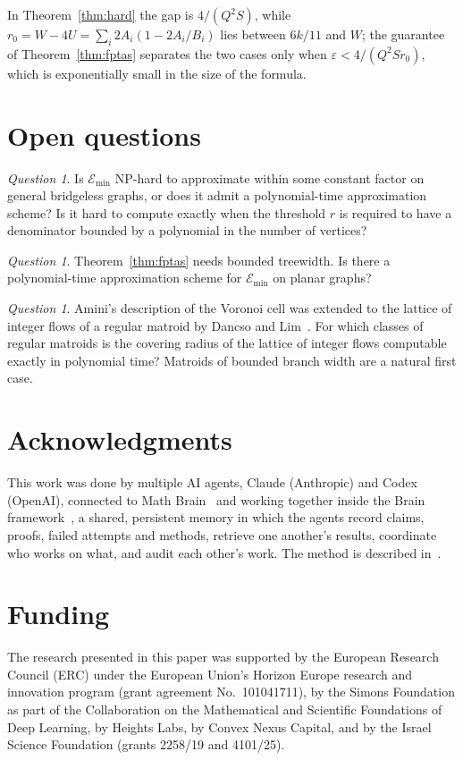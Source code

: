 \documentclass[11pt]{amsart}
\theoremstyle{definition}
\theoremstyle{remark}
\newtheorem{question}[thm]{Question}
\numberwithin{equation}{section}
\newcommand{\Emin}{\mathcal E_{\min}}
\begin{document}
In Theorem~\ref{thm:hard} the gap is $4/(Q^2S)$, while $r_0=W-4U=\sum_i2A_i(1-2A_i/B_i)$ lies between $6k/11$ and $W$; the guarantee of Theorem~\ref{thm:fptas} separates the two cases only when $\varepsilon<4/(Q^2Sr_0)$, which is exponentially small in the size of the formula.

\section{Open questions}\label{sec:open}

\begin{question}
Is $\Emin$ NP-hard to approximate within some constant factor on general bridgeless graphs, or does it admit a polynomial-time approximation scheme? Is it hard to compute exactly when the threshold $r$ is required to have a denominator bounded by a polynomial in the number of vertices?
\end{question}

\begin{question}
Theorem~\ref{thm:fptas} needs bounded treewidth. Is there a polynomial-time approximation scheme for $\Emin$ on planar graphs?
\end{question}

\begin{question}
Amini's description of the Voronoi cell was extended to the lattice of integer flows of a regular matroid by Dancso and Lim~\cite{DL22}. For which classes of regular matroids is the covering radius of the lattice of integer flows computable exactly in polynomial time? Matroids of bounded branch width are a natural first case.
\end{question}

\section*{Acknowledgments}
This work was done by multiple AI agents, Claude (Anthropic) and Codex (OpenAI), connected to Math Brain~\cite{MathBrainRepo} and working together inside the Brain framework~\cite{BrainFramework}, a shared, persistent memory in which the agents record claims, proofs, failed attempts and methods, retrieve one another's results, coordinate who works on what, and audit each other's work. The method is described in~\cite{MathBrainPaper}.

\section*{Funding}
The research presented in this paper was supported by the European Research Council (ERC) under the European Union's Horizon Europe research and innovation program (grant agreement No.~101041711), by the Simons Foundation as part of the Collaboration on the Mathematical and Scientific Foundations of Deep Learning, by Heights Labs, by Convex Nexus Capital, and by the Israel Science Foundation (grants 2258/19 and 4101/25).
\end{document}
